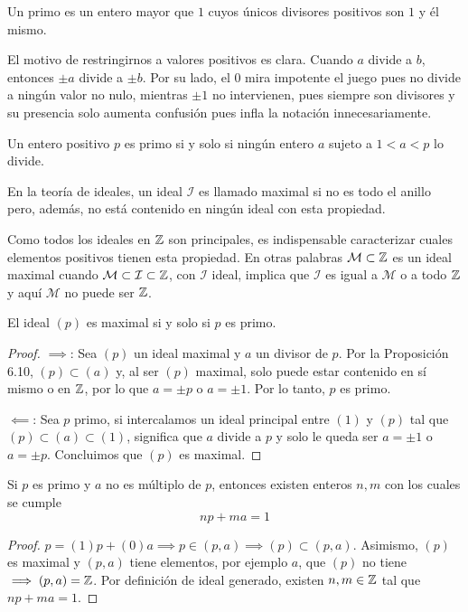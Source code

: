 \documentclass[main.tex]{subfiles}
\begin{document}
\begin{defn}
    Un primo es un entero mayor que $1$ cuyos \'unicos divisores positivos son $1$ y \'el mismo.
\end{defn}

El motivo de restringirnos a valores positivos es clara. Cuando $a$ divide a $b$, entonces $\pm a$ divide a $\pm b$. Por su lado, el $0$ mira impotente el juego pues no divide a ning\'un valor no nulo, mientras $\pm 1$ no intervienen, pues siempre son divisores y su presencia solo aumenta confusi\'on pues infla la notaci\'on innecesariamente.

\begin{lemma}
    Un entero positivo $p$ es primo si y solo si ning\'un entero $a$ sujeto a $1 < a < p$ lo divide.
\end{lemma}

\begin{defn}
    En la teor\'ia de ideales, un ideal $\mathcal{I}$ es llamado maximal si no es todo el anillo pero, adem\'as, no est\'a contenido en ning\'un ideal con esta propiedad.
\end{defn}

Como todos los ideales en $\mathbb Z$ son principales, es indispensable caracterizar cuales elementos positivos tienen esta propiedad. En otras palabras $\mathcal{M} \subset \mathbb Z$ es un ideal maximal cuando $\mathcal{M} \subset \mathcal{I} \subset \mathbb Z$, con $\mathcal{I}$ ideal, implica que $\mathcal{I}$ es igual a $\mathcal{M}$ o a todo $\mathbb Z$ y aqu\'i $\mathcal{M}$ no puede ser $\mathbb Z$.

\begin{proposition}
    El ideal $(p)$ es maximal si y solo si $p$ es primo.
\end{proposition}

\begin{proof}
    $\implies$: Sea $(p)$ un ideal maximal y $a$ un divisor de $p$. Por la Proposici\'on 6.10, $(p) \subset (a)$ y, al ser $(p)$ maximal, solo puede estar contenido en s\'i mismo o en $\mathbb Z$, por lo que $a = \pm p$ o $a = \pm 1$. Por lo tanto, $p$ es primo.
    
    $\impliedby$: Sea $p$ primo, si intercalamos un ideal principal entre $(1)$ y $(p)$ tal que $(p) \subset (a) \subset (1)$, significa que $a$ divide a $p$ y solo le queda ser $a = \pm 1$ o $a = \pm p$. Concluimos que $(p)$ es maximal.
\end{proof}

\begin{theorem}
    Si $p$ es primo y $a$ no es m\'ultiplo de $p$, entonces existen enteros $n, m$ con los cuales se cumple
    $$np + ma = 1$$
\end{theorem}

\begin{proof}
    $p = (1)p + (0)a \implies p \in (p, a) \implies (p) \subset (p, a)$. Asimismo, $(p)$ es maximal y $(p, a)$ tiene elementos, por ejemplo $a$, que $(p)$ no tiene $\implies (p, a) = \mathbb Z$. Por definici\'on de ideal generado, existen $n, m \in \mathbb Z$ tal que $np + ma = 1$.
\end{proof}
\end{document}
